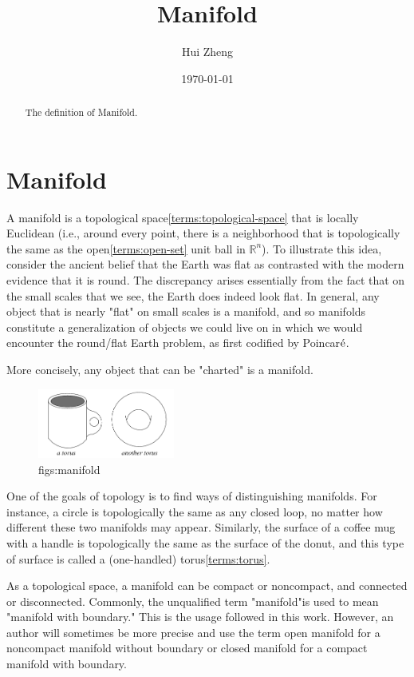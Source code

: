 \documentclass[lang=en,11pt,a4paper,cite=numbers]{elegantpaper}
\title{Manifold}
\author{Hui Zheng}
\date{\today}
\begin{document}
\maketitle

\begin{abstract}
  The definition of Manifold.
\end{abstract}

\section{Manifold\cite{manifold}}
  A manifold is a topological space\ref{terms:topological-space} that is locally Euclidean (i.e., around every point, there is a neighborhood that is topologically the same as the open\ref{terms:open-set} unit ball in $\mathbb{R}^{n}$). To illustrate this idea, consider the ancient belief that the Earth was flat as contrasted with the modern evidence that it is round. The discrepancy arises essentially from the fact that on the small scales that we see, the Earth does indeed look flat. In general, any object that is nearly "flat" on small scales is a manifold, and so manifolds constitute a generalization of objects we could live on in which we would encounter the round/flat Earth problem, as first codified by Poincar$\rm{\acute{e}}$.

  More concisely, any object that can be "charted" is a manifold.
\begin{figure}[!htb]
  \centering
  \includegraphics[width=0.4\textwidth]{figs/manifold.png}
  \caption{figs:manifold}
  \label{figs:manifold}
\end{figure}

  One of the goals of topology is to find ways of distinguishing manifolds. For instance, a circle is topologically the same as any closed loop, no matter how different these two manifolds may appear. Similarly, the surface of a coffee mug with a handle is topologically the same as the surface of the donut, and this type of surface is called a (one-handled) torus\ref{terms:torus}.

  As a topological space, a manifold can be compact or noncompact, and connected or disconnected. Commonly, the unqualified term "manifold"is used to mean "manifold with boundary." This is the usage followed in this work. However, an author will sometimes be more precise and use the term open manifold for a noncompact manifold without boundary or closed manifold for a compact manifold with boundary.
\end{document}
